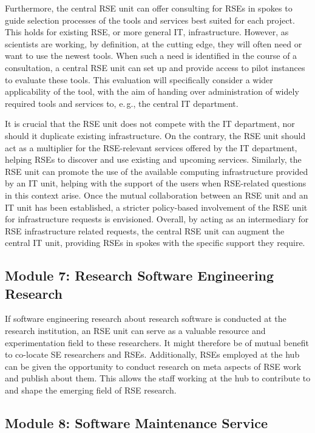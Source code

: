 \documentclass[a4paper]{article}
\makeatletter
\newcommand*{\eg}{e.\,g.\@\xspace}
\makeatother
\begin{document}
Furthermore, the central RSE unit can offer consulting for RSEs in spokes to guide selection processes of the tools and services best suited for each project.
This holds for existing RSE, or more general IT, infrastructure.
However, as scientists are working, by definition, at the cutting edge, they will often need or want to use the newest tools.
When such a need is identified in the course of a consultation, a central RSE unit can set up and provide access to pilot instances to evaluate these tools.
This evaluation will specifically consider a wider applicability of the tool, with the aim of handing over administration of widely required tools and services to, \eg{}, the central IT department.

It is crucial that the RSE unit does not compete with the IT department, nor should it duplicate existing infrastructure.
On the contrary, the RSE unit should act as a multiplier for the RSE-relevant services offered by the IT department, helping RSEs to discover and use existing and upcoming services.
Similarly, the RSE unit can promote the use of the available computing infrastructure provided by an IT unit, helping with the support of the users when RSE-related questions in this context arise.
Once the mutual collaboration between an RSE unit and an IT unit has been established, a stricter policy-based involvement of the RSE unit for infrastructure requests is envisioned.
Overall, by acting as an intermediary for RSE infrastructure related requests, the central RSE unit can augment the central IT unit, providing RSEs in spokes with the specific support they require.

\subsection{Module 7: Research Software Engineering Research}%
\label{sec:rseresearch}

If software engineering research about research software is conducted at the research institution, an RSE unit can serve as a valuable resource and experimentation field to these researchers.
It might therefore be of mutual benefit to co-locate SE researchers and RSEs.
Additionally, RSEs employed at the hub can be given the opportunity to conduct research on meta aspects of RSE work and publish about them.
This allows the staff working at the hub to contribute to and shape the emerging field of RSE research.

\subsection{Module 8: Software Maintenance Service}%
\label{sec:maintenance}
\end{document}
